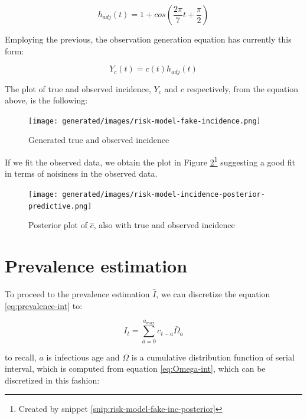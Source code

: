 \documentclass[
  digital, %
  oneside, %
  lof,     %
  lot,     %
]{fithesis4}
\begin{document}
\begin{equation}
  h_{adj}(t) = 1 + cos \left( \frac{2 \pi}{7} t + \frac{\pi}{2} \right)
\end{equation}

Employing the previous, the observation generation equation has currently this form:

\begin{equation}
  Y_{c}(t) = c(t) h_{adj}(t)
\end{equation}

The plot of true and observed incidence, $Y_{c}$ and $c$ respectively, from the equation above, is the following:

\begin{figure}[H]
  \begin{center}
    \texttt{[image: generated/images/risk-model-fake-incidence.png]}
  \end{center}
  \caption{Generated true and observed incidence}
  \label{fig:risk-model-fake-incidence}
\end{figure}

If we fit the observed data, we obtain the plot in Figure \ref{fig:risk-model-incidence-posterior-predictive}\footnote{Created by snippet \ref{snip:risk-model-fake-inc-posterior}} suggesting a good fit in terms of noisiness in the observed data.

\begin{figure}[H]
  \begin{center}
    \texttt{[image: generated/images/risk-model-incidence-posterior-predictive.png]}
  \end{center}
  \caption{Posterior plot of $\hat{c}$, also with true and observed incidence}
  \label{fig:risk-model-incidence-posterior-predictive}
\end{figure}


\section{Prevalence estimation}

To proceed to the prevalence estimation $\hat{I}$, we can discretize the equation \eqref{eq:prevalence-int} to:

\begin{equation}\label{eq:prevalence-sum}
  I_t = \sum_{a=0}^{a_{max}} c_{t - a} \bar{\Omega}_a
\end{equation}

to recall, $a$ is infectious age and $\Omega$ is a cumulative distribution function of serial interval, which is computed from equation \eqref{eq:Omega-int}, which can be discretized in this fashion:
\end{document}
